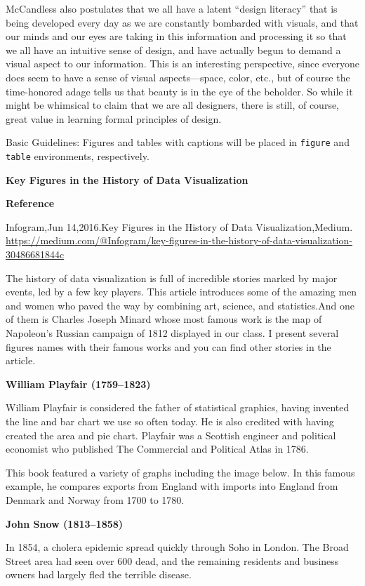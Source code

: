 \documentclass[]{book}
\theoremstyle{definition}
\theoremstyle{definition}
\theoremstyle{definition}
\theoremstyle{remark}
\begin{document}
McCandless also postulates that we all have a latent ``design literacy''
that is being developed every day as we are constantly bombarded with
visuals, and that our minds and our eyes are taking in this information
and processing it so that we all have an intuitive sense of design, and
have actually begun to demand a visual aspect to our information. This
is an interesting perspective, since everyone does seem to have a sense
of visual aspects---space, color, etc., but of course the time-honored
adage tells us that beauty is in the eye of the beholder. So while it
might be whimsical to claim that we are all designers, there is still,
of course, great value in learning formal principles of design.

Basic Guidelines: Figures and tables with captions will be placed in
\texttt{figure} and \texttt{table} environments, respectively.

\textbf{Key Figures in the History of Data Visualization}

\textbf{Reference}

Infogram,Jun 14,2016.Key Figures in the History of Data
Visualization,Medium.
\url{https://medium.com/@Infogram/key-figures-in-the-history-of-data-visualization-30486681844c}

The history of data visualization is full of incredible stories marked
by major events, led by a few key players. This article introduces some
of the amazing men and women who paved the way by combining art,
science, and statistics.And one of them is Charles Joseph Minard whose
most famous work is the map of Napoleon's Russian campaign of 1812
displayed in our class. I present several figures names with their
famous works and you can find other stories in the article.

\textbf{William Playfair (1759--1823)}

William Playfair is considered the father of statistical graphics,
having invented the line and bar chart we use so often today. He is also
credited with having created the area and pie chart. Playfair was a
Scottish engineer and political economist who published The Commercial
and Political Atlas in 1786.

This book featured a variety of graphs including the image below. In
this famous example, he compares exports from England with imports into
England from Denmark and Norway from 1700 to 1780.

\textbf{John Snow (1813--1858)}

In 1854, a cholera epidemic spread quickly through Soho in London. The
Broad Street area had seen over 600 dead, and the remaining residents
and business owners had largely fled the terrible disease.
\end{document}

